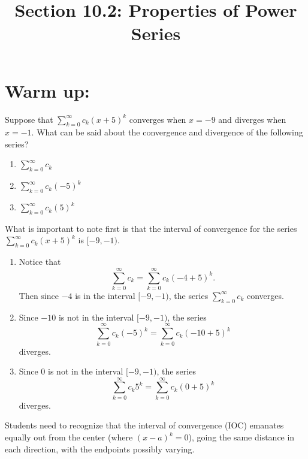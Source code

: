 \documentclass[noinstructornotes]{ximera}
\title{Section 10.2: Properties of Power Series}
\begin{document}
\begin{abstract}		\end{abstract}
\maketitle



\section{Warm up:}
\begin{problem}
Suppose that $\sum_{k=0}^\infty c_k (x+5)^k$ converges when $x=-9$ and diverges when $x=-1$.  
What can be said about the convergence and divergence of the following series?
	\begin{multicols}{3}
	\begin{enumerate}
	\item  $\sum_{k=0}^\infty c_k$
	\item  $\sum_{k=0}^\infty c_k (-5)^k$
	\item  $\sum_{k=0}^\infty c_k (5)^k$
	\end{enumerate}
	\end{multicols}
	
	\begin{freeResponse}
	 What is important to note first is that the interval of convergence for the series $\sum_{k=0}^\infty c_k (x+5)^k$ is $[-9,-1)$. 
	
	\begin{enumerate}
	\item  Notice that
		\[
		\sum_{k=0}^\infty c_k = \sum_{k=0}^\infty c_k (-4+5)^k.
		\]
	Then since $-4$ is in the interval $[-9,-1)$, the series $\sum_{k=0}^\infty c_k$ converges.
	
	\item  Since $-10$ is not in the interval $[-9,-1)$, the series
		\[
		 \sum_{k=0}^\infty c_k (-5)^k = \sum_{k=0}^\infty c_k (-10+5)^k
		\]
	diverges.
	
	\item  Since $0$ is not in the interval $[-9,-1)$, the series
		\[
		\sum_{k=0}^\infty c_k 5^k = \sum_{k=0}^\infty c_k (0+5)^k
		\]
	diverges.
	\end{enumerate}
	\end{freeResponse}
	
\begin{instructorNotes}
Students need to recognize that the interval of convergence (IOC) emanates equally out from the center (where $(x-a)^k = 0$), going the same distance in each direction, with the endpoints possibly varying.
\end{instructorNotes}


\end{problem}
\end{document}

